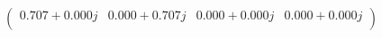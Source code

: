\documentclass[border=1em]{standalone}
\begin{document}
$
\left(
\begin{array}{cccc}
0.707+0.000j & 0.000+0.707j & 0.000+0.000j & 0.000+0.000j \\
\end{array}
\right)
$
\end{document}
